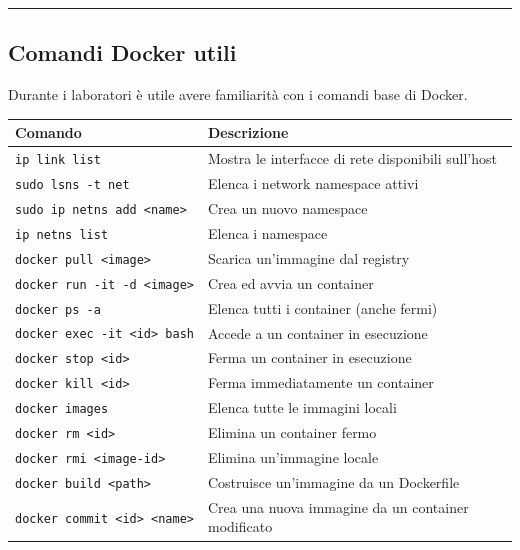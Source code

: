 \documentclass[
  italian,
  openany]{book}
\newcounter{none} %
\begin{document}
\begin{center}\rule{0.5\linewidth}{0.5pt}\end{center}

\subsection{Comandi Docker utili}\label{comandi-docker-utili}

Durante i laboratori è utile avere familiarità con i comandi base di
Docker.

{\def\LTcaptype{none} %
\begin{longtable}[]{@{}
  >{\raggedright\arraybackslash}p{}
  >{\raggedright\arraybackslash}p{}@{}}
\toprule\noalign{}
\begin{minipage}[b]{\linewidth}\raggedright
Comando
\end{minipage} & \begin{minipage}[b]{\linewidth}\raggedright
Descrizione
\end{minipage} \\
\midrule\noalign{}
\endhead
\bottomrule\noalign{}
\endlastfoot
\texttt{ip\ link\ list} & Mostra le interfacce di rete disponibili
sull'host \\
\texttt{sudo\ lsns\ -t\ net} & Elenca i network namespace attivi \\
\texttt{sudo\ ip\ netns\ add\ \textless{}name\textgreater{}} & Crea un
nuovo namespace \\
\texttt{ip\ netns\ list} & Elenca i namespace \\
\texttt{docker\ pull\ \textless{}image\textgreater{}} & Scarica
un'immagine dal registry \\
\texttt{docker\ run\ -it\ -d\ \textless{}image\textgreater{}} & Crea ed
avvia un container \\
\texttt{docker\ ps\ -a} & Elenca tutti i container (anche fermi) \\
\texttt{docker\ exec\ -it\ \textless{}id\textgreater{}\ bash} & Accede a
un container in esecuzione \\
\texttt{docker\ stop\ \textless{}id\textgreater{}} & Ferma un container
in esecuzione \\
\texttt{docker\ kill\ \textless{}id\textgreater{}} & Ferma
immediatamente un container \\
\texttt{docker\ images} & Elenca tutte le immagini locali \\
\texttt{docker\ rm\ \textless{}id\textgreater{}} & Elimina un container
fermo \\
\texttt{docker\ rmi\ \textless{}image-id\textgreater{}} & Elimina
un'immagine locale \\
\texttt{docker\ build\ \textless{}path\textgreater{}} & Costruisce
un'immagine da un Dockerfile \\
\texttt{docker\ commit\ \textless{}id\textgreater{}\ \textless{}name\textgreater{}}
& Crea una nuova immagine da un container modificato \\
\end{longtable}
}
\end{document}
